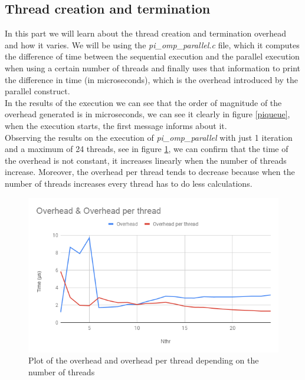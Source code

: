 \documentclass[12]{article}
\begin{document}
\subsection{Thread creation and termination}
In this part we will learn about the thread creation and termination overhead and how it varies. We will be using the \textit{pi\_omp\_parallel.c} file, which it computes the difference of time between the sequential execution and the parallel execution when using a certain number of threads and finally uses that information to print the difference in time (in microseconds), which is the overhead introduced by the parallel construct. 
\\
\medskip
In the results of the execution we can see that the order of magnitude of the overhead generated is in microseconds, we can see it clearly in figure \ref{piqueue}, when the execution starts, the first message informs about it. 
\\
Observing the results on the execution of \textit{pi\_omp\_parallel} with just 1 iteration and a maximum of 24 threads, see in figure \ref{overheadplot1}, we can confirm that the time of the overhead is not constant, it increases linearly when the number of threads increase. Moreover, the overhead per thread tends to decrease because when the number of threads increases every thread has to do less calculations.

\begin{figure}[H]
\centering
\includegraphics[scale=0.5]{images/thread.png}
\caption{Plot of the overhead and overhead per thread depending on the number of threads}
\label{overheadplot1}
\end{figure}
\end{document}
